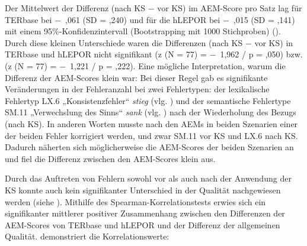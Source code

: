Der Mittelwert der Differenz (nach KS $-$ vor KS) im AEM-Score pro Satz lag für TERbase bei $-$~,061 (SD = ,240) und für die hLEPOR bei $-$~,015 (SD = ,141) mit einem 95\%\nobreakdash-Konfidenzintervall (Bootstrapping mit 1000 Stichproben) (). Durch diese kleinen Unterschiede waren die Differenzen (nach KS $-$ vor KS) in TERbase und hLEPOR nicht signifikant (z (N = 77) = $-$~1,962 / p = ,050) bzw. (z (N = 77) = $-$~1,221 / p = ,222). Eine mögliche Interpretation, warum die Differenz der AEM-Scores klein war: Bei dieser Regel gab es signifikante Veränderungen in der Fehleranzahl bei zwei Fehlertypen: der lexikalische Fehlertyp LX.6 „Konsistenzfehler“ \textit{stieg} (vlg. ) und der semantische Fehlertype SM.11 „Verwechslung des Sinns“ \textit{sank} (vlg. ) nach der Wiederholung des Bezugs (nach KS). In anderen Worten musste nach den AEMs in beiden Szenarien einer der beiden Fehler korrigiert werden, und zwar SM.11 vor KS und LX.6 nach KS. Dadurch näherten sich möglicherweise die AEM-Scores der beiden Szenarien an und fiel die Differenz zwischen den AEM-Scores klein aus.


Durch das Auftreten von Fehlern sowohl vor als auch nach der Anwendung der KS konnte auch kein signifikanter Unterschied in der Qualität nachgewiesen werden (siehe ). Mithilfe des Spearman-Korrelationstests erwies sich ein signifikanter mittlerer positiver Zusammenhang zwischen den Differenzen der AEM-Scores von TERbase und hLEPOR und der Differenz der allgemeinen Qualität.  demonstriert die Korrelationswerte:


